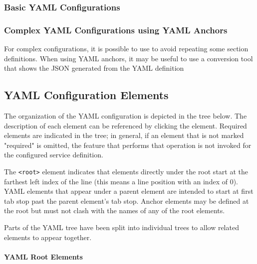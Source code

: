 \subsubsection{Basic YAML Configurations}



\newpage



\subsubsection{Complex YAML Configurations using YAML Anchors}

For complex configurations, it is possible to use 
to avoid repeating some section definitions.  When using YAML anchors, it may be useful
to use a  conversion tool that shows the JSON generated from the YAML
definition



\subsection{YAML Configuration Elements}\label{sec:yaml-config}

The organization of the YAML configuration is depicted in the tree below.  The description of each element
can be referenced by clicking the element.  Required elements are indicated in the tree; in general, if an
element that is not marked "required" is omitted, the feature that performs that operation is not invoked
for the configured service definition.

The \texttt{<root>} element indicates that elements directly under the root start at the farthest
left index of the line (this means a line position with an index of 0).  YAML elements that appear
under a parent element are intended to start at first tab stop past the parent element's tab stop.
Anchor elements may be defined at the root but must not clash with the names of any of the root elements.

Parts of the YAML tree have been split into individual trees to allow related elements to appear together.

\paragraph{YAML Root Elements}\label{sec:yaml-root}

